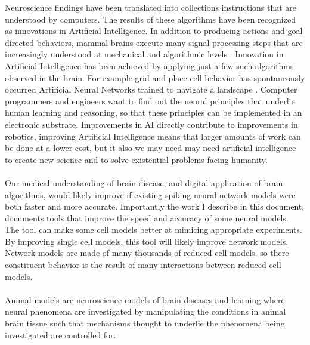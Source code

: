 Neuroscience findings have been translated into collections instructions that are understood by computers. The results of these algorithms have been recognized as innovations in Artificial Intelligence. In addition to producing actions and goal directed behaviors, mammal brains execute many signal processing steps that are increasingly understood at  mechanical and algorithmic levels \cite{marr1976understanding}. Innovation in Artificial Intelligence has been achieved by applying just a few such algorithms observed in the brain. For example grid and place cell behavior has spontaneously occurred Artificial Neural Networks trained to navigate a landscape \cite{banino2018vector}. Computer programmers and engineers want to find out the neural principles that underlie human learning and reasoning, so that these principles can be implemented in an electronic substrate. Improvements in AI directly contribute to improvements in robotics, improving Artificial Intelligence means that larger amounts of work can be done at a lower cost, but it also we may need may need artificial intelligence to create new science and to solve existential problems facing humanity.\\
\\
Our medical understanding of brain disease, and digital application of brain algorithms, would likely improve if existing spiking neural network models were both faster and more accurate. Importantly the work I describe in this document, documents tools that improve the speed and accuracy of some neural models. The tool can make some cell models better at mimicing appropriate experiments. By improving single cell models, this tool will likely improve network models. Network models are made of many thousands of reduced cell models, so there constituent behavior is the result of many interactions between reduced cell models.\\ 
\\
Animal models are neuroscience models of brain diseases and learning where neural phenomena are investigated by manipulating the conditions in animal brain tissue such that mechanisms thought to underlie the phenomena being investigated are controlled for. 


